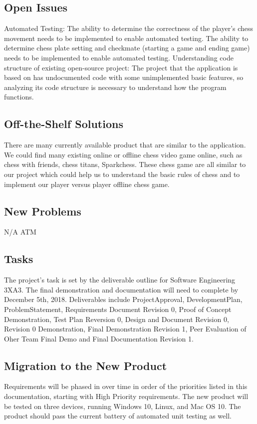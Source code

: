 \documentclass[12pt, titlepage]{article}
\begin{document}
\subsection{Open Issues}
Automated Testing:
The ability to determine the correctness of the player's chess movement needs to be implemented to enable automated testing.
The ability to determine chess plate setting and checkmate (starting a game and ending game) needs to be implemented to enable automated testing.
\medskip \newline
Understanding code structure of existing open-source project:
The project that the application is based on has undocumented code with some unimplemented basic features, so analyzing its code structure is necessary to understand how the program functions.
\subsection{Off-the-Shelf Solutions}
There are many currently available product that are similar to the application. We could find many existing online or offline chess video game online, such as chess with friends, chess titans, Sparkchess. These chess game are all similar to our project which could help us to understand the basic rules of chess and to implement our player versus player offline chess game.

\subsection{New Problems}
N/A ATM

\subsection{Tasks}
The project's task is set by the deliverable outline for Software Engineering 3XA3. The final demonstration and documentation will need to complete by December 5th, 2018. Deliverables include ProjectApproval, DevelopmentPlan, ProblemStatement, Requirements Document Revision 0, Proof of Concept Demonstration, Test Plan Reversion 0, Design and Document Revision 0, Revision 0 Demonstration, Final Demonstration Revision 1, Peer Evaluation of Oher Team Final Demo and Final Documentation Revision 1.

\subsection{Migration to the New Product}
Requirements will be phased in over time in order of the priorities listed in this documentation, starting with High Priority requirements. The new product will be tested on three devices, running Windows 10, Linux, and Mac OS 10. The product should pass the current battery of automated unit testing as well.
\end{document}
